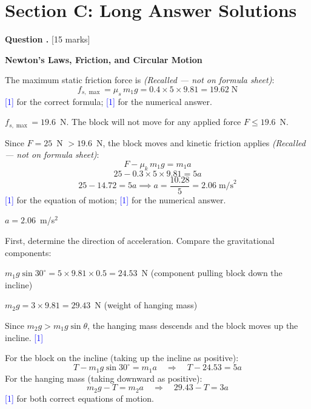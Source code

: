 \documentclass[12pt,a4paper]{article}
\newcounter{questioncounter}
\newcommand{\question}[1]{%
  \stepcounter{questioncounter}%
  \vspace{0.5cm}%
  \noindent\textbf{Question \thequestioncounter.} \hfill [#1 marks]%
  \vspace{0.2cm}%
  \par%
}
\newcommand{\markstep}[1]{\hfill\textcolor{blue}{[#1]}}
\newcommand{\finalanswer}[1]{%
  \begin{tcolorbox}[colback=green!5!white,colframe=green!50!black,boxrule=0.5pt]
  #1
  \end{tcolorbox}
}
\newcommand{\recalled}{\textit{(Recalled --- not on formula sheet)}}
\begin{document}
\newpage

\section*{Section C: Long Answer Solutions}

\setcounter{questioncounter}{0}

\question{15}

\noindent\textbf{Newton's Laws, Friction, and Circular Motion}

\begin{parts}
\item
\begin{parts}
\item The maximum static friction force is \recalled:
\[
f_{s,\max} = \mu_s \, m_1 g = 0.4 \times 5 \times 9.81 = 19.62 \;\text{N}
\]
\markstep{1} for the correct formula; \markstep{1} for the numerical answer.

\finalanswer{$f_{s,\max} = 19.6$~N. The block will not move for any applied force $F \le 19.6$~N.}

\item Since $F = 25$~N $> 19.6$~N, the block moves and kinetic friction applies \recalled:
\[
F - \mu_k\,m_1 g = m_1 a
\]
\[
25 - 0.3 \times 5 \times 9.81 = 5a
\]
\[
25 - 14.72 = 5a \implies a = \frac{10.28}{5} = 2.06 \;\text{m/s}^2
\]
\markstep{1} for the equation of motion; \markstep{1} for the numerical answer.

\finalanswer{$a = 2.06$~m/s$^2$}
\end{parts}

\item First, determine the direction of acceleration. Compare the gravitational components:

$m_1 g \sin 30^\circ = 5 \times 9.81 \times 0.5 = 24.53$~N (component pulling block down the incline)

$m_2 g = 3 \times 9.81 = 29.43$~N (weight of hanging mass)

Since $m_2 g > m_1 g \sin\theta$, the hanging mass descends and the block moves up the incline. \markstep{1}

For the block on the incline (taking up the incline as positive):
\[
T - m_1 g \sin 30^\circ = m_1 a \quad \Rightarrow \quad T - 24.53 = 5a \tag{1}
\]
For the hanging mass (taking downward as positive):
\[
m_2 g - T = m_2 a \quad \Rightarrow \quad 29.43 - T = 3a \tag{2}
\]
\markstep{1} for both correct equations of motion.


\end{parts}
\end{document}
